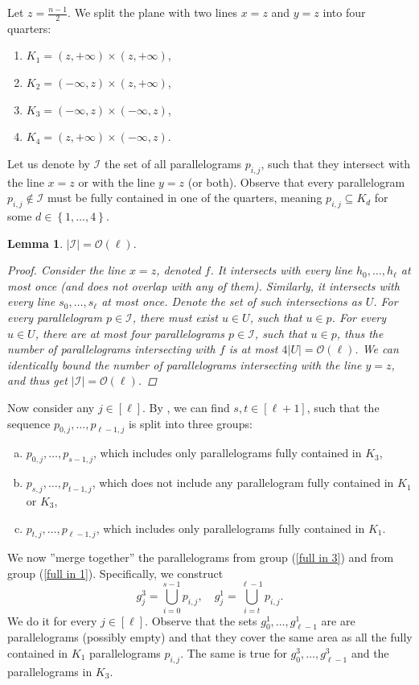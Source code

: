 \documentclass[11pt, letterpaper]{article}
\theoremstyle{plain}
\newtheorem{lemma}{Lemma}
\theoremstyle{definition}
\theoremstyle{remark}
\renewcommand{\O}{\mathcal{O}}
\newcommand{\set}[1]{\left\lbrace #1 \right\rbrace}
\begin{document}
Let $z = \frac{n - 1}{2}$. 
We split the plane with two lines $x = z$ and $y = z$ into four quarters:
\begin{enumerate}[1)]
	\item $K_1 = (z, +\infty) \times (z, +\infty)$,
	\item $K_2 = (-\infty, z) \times (z, +\infty)$,
	\item $K_3 = (-\infty, z) \times (-\infty, z)$,
	\item $K_4 = (z, +\infty) \times (-\infty, z)$.
\end{enumerate}
\newcommand{\I}{\mathcal{I}}
\newcommand{\G}{\mathcal{G}}
\newcommand{\C}{\mathcal{C}}
Let us denote by $\I$ the set of all parallelograms $p_{i, j}$, such that they intersect with the line $x = z$ or with the line $y = z$ (or both).
Observe that every parallelogram $p_{i, j} \not \in \I$ must be fully contained in one of the quarters, meaning $p_{i, j} \subseteq K_d$ for some $d \in \set{1, \dots, 4}$.

\begin{lemma}\label{I_size_bound}
	$|\I| = \O(\ell).$
	\begin{proof}
		Consider the line $x = z$, denoted $f$.
		It intersects with every line $h_0, \dots, h_\ell$ at most once (and does not overlap with any of them).
		Similarly, it intersects with every line $s_0, \dots, s_\ell$ at most once.
		Denote the set of such intersections as $U$.
		For every parallelogram $p \in \I$, there must exist $u \in U$, such that $u \in p$.
		For every $u \in U$, there are at most four parallelograms $p \in \I$, such that $u \in p$,
		thus the number of parallelograms intersecting with $f$ is at most $4|U| = \O(\ell)$.
		We can identically bound the number of parallelograms intersecting with the line $y = z$, and thus get $|\I| = \O(\ell)$.
	\end{proof}
\end{lemma}

Now consider any $j \in [\ell]$.
By , we can find $s, t \in [\ell + 1]$, such that the sequence $p_{0, j}, \dots, p_{\ell - 1, j}$ is split into three groups:
\begin{enumerate}[a)]
	\item $p_{0, j}, \dots, p_{s - 1, j}$, which includes only parallelograms fully contained in $K_3$, \label{full in 3}
	\item $p_{s, j}, \dots, p_{t - 1, j}$, which does not include any parallelogram fully contained in $K_1$ or $K_3$,
	\item $p_{t, j}, \dots, p_{\ell - 1, j}$, which includes only parallelograms fully contained in $K_1$. \label{full in 1}
\end{enumerate}
We now ''merge together'' the parallelograms from group (\ref{full in 3}) and from group (\ref{full in 1}).
Specifically, we construct
\[
g^3_j = \bigcup_{i = 0}^{s - 1} p_{i, j}, \quad 
g^1_j = \bigcup_{i = t}^{\ell - 1} p_{i, j}.
\]
We do it for every $j \in [\ell]$.
Observe that the sets $g^1_0, \dots, g^1_{\ell - 1}$ are are parallelograms (possibly empty) and that they cover the same area as all the fully contained in $K_1$ parallelograms $p_{i, j}$.
The same is true for $g^3_0, \dots, g^3_{\ell - 1}$ and the parallelograms in $K_3$. 
\end{document}
